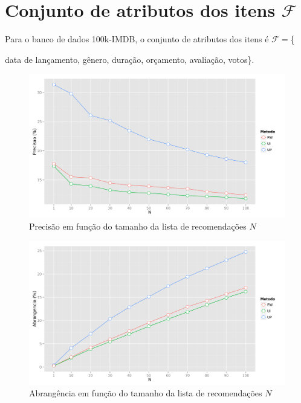 \section{Conjunto de atributos dos itens
 $\mathcal{F}$} %
\label{sec:conjunto_de_atributos_dos_itens_}

Para o banco de dados 100k-IMDB, o conjunto de atributos dos itens é $\mathcal{F}=$\{{data de lançamento, gênero, duração, orçamento, avaliação, votos\}. 


\begin{figure}[htp]
    \begin{center}
    \includegraphics[width=1\textwidth]{img/precision_N_F}
    \end{center}
    \caption{Precisão em função do tamanho da lista de recomendações $N$}
    \label{fig:precision_N_F}
\end{figure}


\begin{figure}[htp]
    \begin{center}
    \includegraphics[width=1\textwidth]{img/recall_N_F}
    \end{center}
    \caption{Abrangência em função do tamanho da lista de recomendações $N$}
    \label{fig:recall_N_F}
\end{figure}

}
